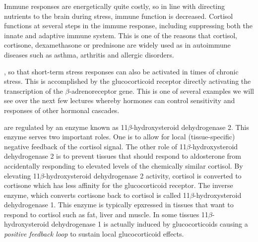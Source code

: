 \documentclass{tufte-handout}
\begin{document}
  Immune responses are energetically quite costly, so in line with directing nutrients to the brain during stress, immune function is decreased.  Cortisol functions at several steps in the immune response, including suppressing both the innate and adaptive immune system.  This is one of the reasons that cortisol, cortisone, dexamethasone or prednisone are widely used as in autoimmune diseases such as asthma, arthritis and allergic disorders.

, so that short-term stress responses can also be activated in times of chronic stress.  This is accomplished by the glucocorticoid receptor directly activating the transcription of the $\beta$-adrenoreceptor gene\cite{Hadcock1988}.  This is one of several examples we will see over the next few lectures whereby hormones can control sensitivity and responses of other hormonal cascades.

 are regulated by an enzyme known as 11$\beta$-hydroxysteroid dehydrogenase 2.  This enzyme serves two important roles.  One is to allow for local (tissue-specific) negative feedback of the cortisol signal.  The other role of 11$\beta$-hydroxysteroid dehydrogenase 2 is to prevent tissues that should respond to aldosterone from accidentally responding to elevated levels of the chemically similar cortisol.  By elevating 11$\beta$-hydroxysteroid dehydrogenase 2 activity, cortisol is converted to cortisone which has less affinity for the glucocorticoid receptor.  The inverse enzyme, which converts cortisone back to cortisol is called 11$\beta$-hydroxysteroid dehydrogenase 1.  This enzyme is typically epxressed in tissues that want to respond to cortisol such as fat, liver and muscle.  In some tissues 11$\beta$-hydroxysteroid dehydrogenase 1 is actually induced by glucocorticoids causing a \emph{positive feedback loop} to sustain local glucocorticoid effects.
\end{document}
